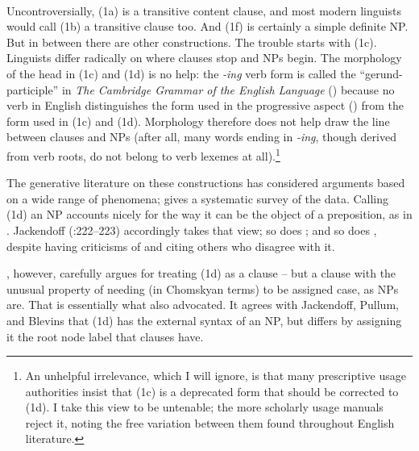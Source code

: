 \documentclass[output=paper,colorlinks,citecolor=brown
]{langscibook}
\begin{document}
\ea \ea {} \\
    \ex {}  \\
    \ex {} \\
    \ex {} \\
    \ex {} \\
    \ex {} \\
    \z
\z
\noindent
Uncontroversially, (1a) is a transitive content clause, and most
modern linguists would call (1b) a transitive clause too.
And (1f) is certainly a simple definite NP. But in between there are
other constructions. The trouble starts with (1c). Linguists differ
radically on where clauses stop and NPs begin.
The morphology of the head in (1c) and (1d) is no help:
the \textit{-ing} verb form is called the ``gerund-participle'' in
\textit{The Cambridge Grammar of the English Language}
(\citealt{HuddPull02}) because no verb in English distinguishes the form
used in the progressive aspect () from the form used
in (1c) and (1d). Morphology therefore does not help draw the line
between clauses and NPs (after all, many words ending in
\mbox{\itshape-ing}, though derived from verb roots, do not belong
to verb lexemes at all).\footnote{%
   An unhelpful irrelevance, which I will ignore, is that many
   prescriptive usage authorities insist that (1c) is a deprecated
   form that should be corrected to (1d). I take this view to be
   untenable; the more scholarly usage manuals reject it, noting the
   free variation between them found throughout English literature.}

The generative literature on these constructions has considered
arguments based on a wide range of phenomena; \citet{Pullum91}
gives a systematic survey of the data. Calling (1d) an NP accounts
nicely for the way it can be the object of a preposition, as in
. Jackendoff
(\citeyear{Jackendoff77}:222--223) accordingly takes that view; so
does \citet{Pullum91}; and so does \citet{Blevins05}, despite having
criticisms of \citet{Pullum91} and citing others who disagree with it.

\citet{Kiparsky17}, however, carefully argues for treating (1d) as
a clause -- but a clause with the unusual property of needing (in
Chomskyan terms) to be assigned case, as NPs are. That is essentially
what \citet{Stowell81} also advocated. It agrees with Jackendoff,
Pullum, and Blevins that (1d) has the external syntax of an NP, but
differs by assigning it the root node label that clauses have.
\end{document}
